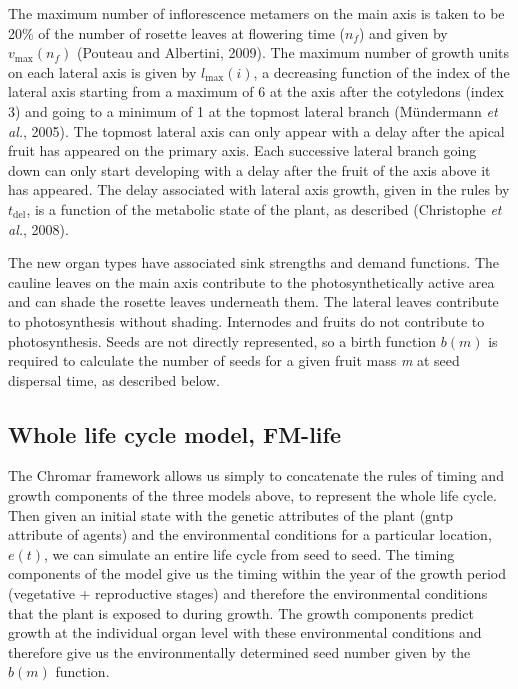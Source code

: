 \documentclass[phd]{infthesis}
\begin{document}
The maximum number of inflorescence metamers on the main axis is taken
to be 20\% of the number of rosette leaves at flowering time (\(n_{f}\))
and given by \(v_{\max}(n_{f})\) (Pouteau and Albertini, 2009). The
maximum number of growth units on each lateral axis is given by
\(l_{\max}(i)\), a decreasing function of the index of the lateral axis
starting from a maximum of 6 at the axis after the cotyledons (index 3)
and going to a minimum of 1 at the topmost lateral branch (Mündermann
\emph{et al.}, 2005). The topmost lateral axis can only appear with a
delay after the apical fruit has appeared on the primary axis. Each
successive lateral branch going down can only start developing with a
delay after the fruit of the axis above it has appeared. The delay
associated with lateral axis growth, given in the rules by
\(t_{\text{del}}\), is a function of the metabolic state of the plant,
as described (Christophe \emph{et al.}, 2008).

The new organ types have associated sink strengths and demand functions.
The cauline leaves on the main axis contribute to the photosynthetically
active area and can shade the rosette leaves underneath them. The
lateral leaves contribute to photosynthesis without shading. Internodes
and fruits do not contribute to photosynthesis. Seeds are not directly
represented, so a birth function \(b(m)\) is required to calculate the
number of seeds for a given fruit mass \emph{m} at seed dispersal time,
as described below.

\subsection{Whole life cycle model,
  FM-life}
\label{whole-life-cycle-model-fm-life}

The Chromar framework allows us simply to concatenate the rules of
timing and growth components of the three models above, to represent the
whole life cycle. Then given an initial state with the genetic
attributes of the plant (\(\text{gntp}\) attribute of agents) and the
environmental conditions for a particular location, \(e(t)\), we can
simulate an entire life cycle from seed to seed. The timing components
of the model give us the timing within the year of the growth period
(vegetative + reproductive stages) and therefore the environmental
conditions that the plant is exposed to during growth. The growth
components predict growth at the individual organ level with these
environmental conditions and therefore give us the environmentally
determined seed number given by the \(b(m)\) function.
\end{document}
